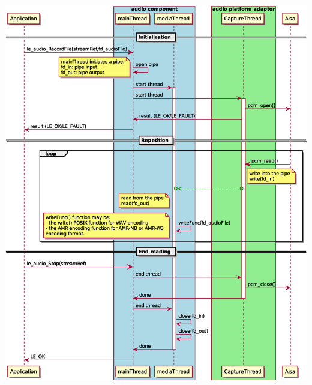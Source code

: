 \begin{DoxyImageNoCaption}
  \mbox{\includegraphics[width=\textwidth,height=\textheight/2,keepaspectratio=true]{le_audio_RecordFile}}
\end{DoxyImageNoCaption}


